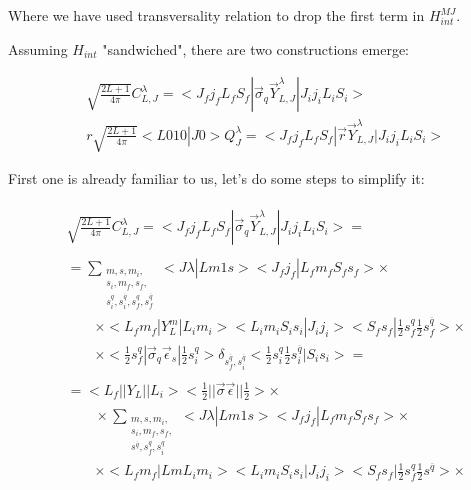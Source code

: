 Where we have used transversality relation to drop the first term in $H_{int}^{MJ}$.

Assuming $H_{int}$ "sandwiched", there are two constructions emerge:

\begin{align}
    &\sqrt{\frac{2L+1}{4\pi}} C_{L, J}^\lambda = <J_f j_f L_f S_f|\vec{\sigma}_{q} \vec{Y}^{\lambda}_{L, J}|J_i j_i L_i S_i> \\
    &r \sqrt{\frac{2L+1}{4\pi}} <L 0 1 0 | J 0> Q_{J}^\lambda = <J_f j_f L_f S_f|\vec{r} \vec{Y}^{\lambda}_{L, J}|J_i j_i L_i S_i>
\end{align}

First one is already familiar to us, let's do some steps to simplify it:

\begin{align} \label{app:hint-mult:Ccoef-reduce}
    \begin{split}
        &\sqrt{\frac{2L+1}{4 \pi}} C_{L, J}^\lambda = <J_f j_f L_f S_f| \vec{\sigma}_q \vec{Y}_{L, J}^\lambda |J_i j_i L_i S_i> =
    \end{split} \\
    \begin{split}
        &= \sum_{\substack{m, s, m_i,\\ s_i, m_f, s_f,\\ s_i^{q}, s_{i}^{\overline{q}}, s_{f}^{q}, s_{f}^{\overline{q}}}} <J \lambda| L m 1 s> <J_f j_f| L_f m_f S_f s_f> \times \\
        &\qquad\times <L_f m_f| Y_{L}^{m} |L_i m_i> <L_i m_i S_i s_i| J_i j_i> <S_f s_f| \frac{1}{2} s_f^{q} \frac{1}{2} s_f^{\overline{q}}> \times \\
        &\qquad\times <\frac{1}{2} s_f^q| \vec{\sigma}_q \vec{\epsilon}_{s} |\frac{1}{2} s_i^q> \delta_{s_f^{\overline{q}}, s_i^{\overline{q}}} <\frac{1}{2} s_i^{q} \frac{1}{2} s_i^{\overline{q}} |S_i s_i> =
    \end{split} \\
    \begin{split}
        &= <L_f|| Y_L ||L_i> <\frac{1}{2}|| \vec{\sigma}\vec{\epsilon} ||\frac{1}{2}> \times \\
        &\qquad\times \sum_{\substack{m, s, m_i,\\ s_i, m_f, s_f, \\s^{\overline{q}}, s_{f}^{q}, s_i^q}} <J \lambda| L m 1 s> <J_f j_f| L_f m_f S_f s_f> \times \\
        &\qquad\times <L_f m_f| L m L_i m_i> <L_i m_i S_i s_i| J_i j_i> <S_f s_f| \frac{1}{2} s_f^{q} \frac{1}{2} s^{\overline{q}}> \times \\

\end{split}
\end{align}
